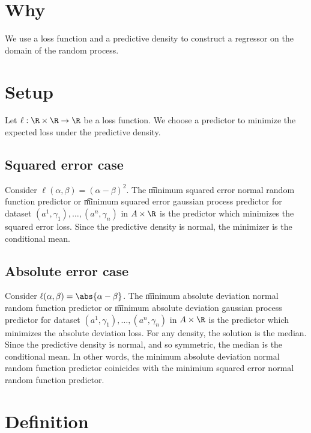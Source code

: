 

\section*{Why}

We use a loss function and a predictive density to construct a regressor on the domain of the random process.

\section*{Setup}

Let $\ell : \R  \times \R  \to \R $ be a loss function.
We choose a predictor to minimize the expected loss under the predictive density.

\subsection*{Squared error case}

Consider $\ell (\alpha , \beta ) = (\alpha  - \beta )^2$.
The \t{minimum squared error normal random function predictor} or \t{minimum squared error gaussian process predictor} for dataset $(a^1, \gamma _1), \dots , (a^n, \gamma _n)$ in $A \times \R $ is the predictor which minimizes the squared error loss.
Since the predictive density is normal, the minimizer is the conditional mean.

\subsection*{Absolute error case}

Consider $\ell (\alpha , \beta ) = \abs{\alpha  - \beta }$.
The \t{minimum absolute deviation normal random function predictor} or \t{minimum absolute deviation gaussian process predictor} for dataset $(a^1, \gamma _1), \dots , (a^n, \gamma _n)$ in $A \times \R $ is the predictor which minimizes the absolute deviation loss.
For any density, the solution is the median.
Since the predictive density is normal, and so symmetric, the median is the conditional mean.
In other words, the minimum absolute deviation normal random function predictor coinicides with the minimium squared error normal random function predictor.

\section*{Definition}


